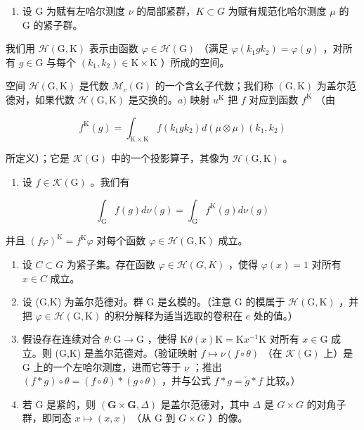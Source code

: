 \begin{enumerate}
\def\labelenumi{\arabic{enumi})}
\setcounter{enumi}{24}
\tightlist
\item
  设 G 为赋有左哈尔测度 \(\nu\) 的局部紧群，\(K \subset G\) 为赋有规范化哈尔测度 \(\mu\) 的 G 的紧子群。
\end{enumerate}

我们用 \(\mathcal{H}(\mathrm{G},\mathrm{K})\) 表示由函数 \(\varphi \in \mathcal{H}(\mathrm{G})\) （满足 \(\varphi (k_1gk_2) = \varphi (g)\) ，对所有 \(g\in \mathrm{G}\) 与每个 \((k_{1},k_{2})\in \mathrm{K}\times \mathrm{K}\) ）所成的空间。

空间 \(\mathcal{H}(\mathrm{G},\mathrm{K})\) 是代数 \(\mathcal{M}_c(\mathrm{G})\) 的一个含幺子代数；我们称 \((\mathrm{G},\mathrm{K})\) 为盖尔范德对，如果代数 \(\mathcal{H}(\mathrm{G},\mathrm{K})\) 是交换的。\(a)\) 映射 \(u^{\mathrm{K}}\) 把 \(f\) 对应到函数 \(f^{\mathrm{K}}\) （由

\[
f ^ {\mathrm{K}} (g) = \int_ {\mathrm{K} \times \mathrm{K}} f (k _ {1} g k _ {2}) d (\mu \otimes \mu) (k _ {1}, k _ {2})
\]

所定义）；它是 \(\mathcal{K}(\mathrm{G})\) 中的一个投影算子，其像为 \(\mathcal{H}(\mathrm{G},\mathrm{K})\) 。

\begin{enumerate}
\def\labelenumi{\alph{enumi})}
\setcounter{enumi}{1}
\tightlist
\item
  设 \(f\in \mathcal{K}(\mathrm{G})\) 。我们有
\end{enumerate}

\[
\int_ {\mathrm{G}} f (g) d \nu (g) = \int_ {\mathrm{G}} f ^ {\mathrm{K}} (g) d \nu (g)
\]

并且 \((f\varphi)^{\mathrm{K}} = f^{\mathrm{K}}\varphi\) 对每个函数 \(\varphi \in \mathcal{H}(\mathrm{G},\mathrm{K})\) 成立。

\begin{enumerate}
\def\labelenumi{\alph{enumi})}
\setcounter{enumi}{2}
\item
  设 \(C \subset G\) 为紧子集。存在函数 \(\varphi \in \mathcal{H}(G, K)\) ，使得 \(\varphi(x) = 1\) 对所有 \(x \in C\) 成立。
\item
  设 (G,K) 为盖尔范德对。群 G 是幺模的。（注意 G 的模属于 \(\mathcal{H}(\mathrm{G},\mathrm{K})\) ，并把 \(\varphi \in \mathcal{H}(\mathrm{G},\mathrm{K})\) 的积分解释为适当选取的卷积在 \(e\) 处的值。）
\item
  假设存在连续对合 \(\theta\colon\mathrm{G}\to\mathrm{G}\) ，使得 \(\mathrm{K}\theta(x)\mathrm{K}=\mathrm{K}x^{-1}\mathrm{K}\) 对所有 \(x\in\mathrm{G}\) 成立。则 (G,K) 是盖尔范德对。（验证映射 \(f\mapsto\nu(f\circ\theta)\) （在 \(\mathcal{K}(\mathrm{G})\) 上）是 G 上的一个左哈尔测度，进而它等于 \(\underline{\nu}\) ；推出 \((f*g)\circ\theta=(f\circ\theta)*(g\circ\theta)\) ，并与公式 \(f*g=\check{g}*f\) 比较。）
\item
  若 G 是紧的，则 \((\mathbf{G} \times \mathbf{G}, \Delta)\) 是盖尔范德对，其中 \(\Delta\) 是 \(G \times G\) 的对角子群，即同态 \(x \mapsto (x, x)\) （从 G 到 \(G \times G\) ）的像。
\end{enumerate}

